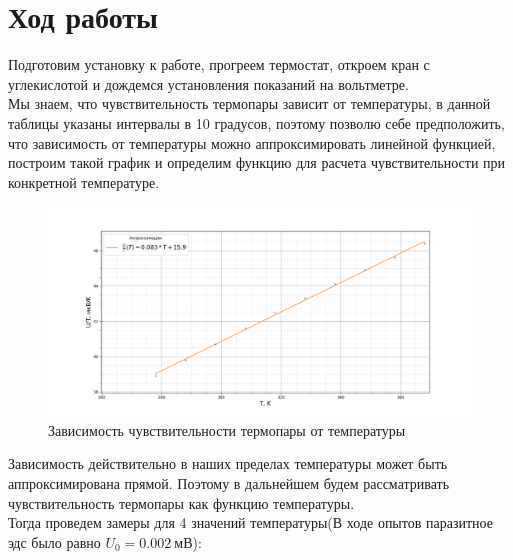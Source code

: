 \documentclass[a4paper, 12pt]{article}%
\begin{document}
	\section{Ход работы}
	Подготовим установку к работе, прогреем термостат, откроем кран с углекислотой и дождемся установления показаний на вольтметре.\\
	Мы знаем, что чувствительность термопары зависит от температуры, в данной таблицы указаны интервалы в 10 градусов, поэтому позволю себе предположить, что зависимость от температуры можно аппроксимировать линейной функцией, построим такой график и определим функцию для расчета чувствительности при конкретной температуре. 
	\begin{figure}[H]
		\centering
		\includegraphics[width=0.9\linewidth]{rt}
		\caption[]{Зависимость чувствительности термопары от температуры}
		\label{fig:rt}
	\end{figure}
	Зависимость действительно в наших пределах температуры может быть аппроксимирована прямой. Поэтому в дальнейшем будем рассматривать чувствительность термопары как функцию температуры.\\
	Тогда проведем замеры для 4 значений температуры(В ходе опытов паразитное эдс было равно $U_0 = 0.002~мВ$):\\
\end{document}
